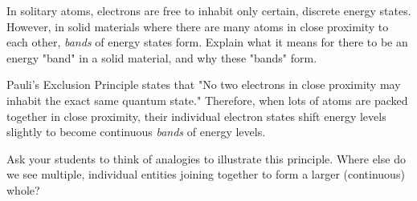 

In solitary atoms, electrons are free to inhabit only certain, discrete energy states.  However, in solid materials where there are many atoms in close proximity to each other, {\it bands} of energy states form.  Explain what it means for there to be an energy "band" in a solid material, and why these "bands" form.







Pauli's Exclusion Principle states that "No two electrons in close proximity may inhabit the exact same quantum state."  Therefore, when lots of atoms are packed together in close proximity, their individual electron states shift energy levels slightly to become continuous {\it bands} of energy levels.







Ask your students to think of analogies to illustrate this principle.  Where else do we see multiple, individual entities joining together to form a larger (continuous) whole?




